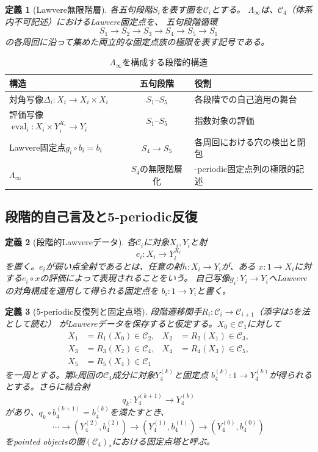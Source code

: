 \documentclass[11pt,a4paper]{ltjsarticle}
\newtheorem{definition}{定義}[section]
\theoremstyle{remark}
\newcommand{\LawvereInfinity}{\Lambda_\infty}
\begin{document}
\begin{definition}[Lawvere無限階層]
各五句段階$S_i$を表す圏を$\mathcal{C}_i$とする。
$\LawvereInfinity$は、$\mathcal{C}_4$（体系内不可記述）におけるLawvere固定点を、
五句段階循環
\[
 S_1\longrightarrow S_2\longrightarrow S_3\longrightarrow S_4
 \longrightarrow S_5\longrightarrow S_1
\]
の各周回に沿って集めた両立的な固定点族の極限を表す記号である。
\end{definition}

\begin{table}[htbp]
\centering
\caption{$\LawvereInfinity$を構成する段階的構造}
\label{tab:lambda-stage}
\small
\begin{tabularx}{\textwidth}{@{}>{\raggedright\arraybackslash}X c >{\raggedright\arraybackslash}X@{}}
\toprule
構造 & 五句段階 & 役割 \\
\midrule
対角写像$\Delta_i:X_i\to X_i\times X_i$ & $S_1$--$S_5$ & 各段階での自己適用の舞台 \\
評価写像$\operatorname{eval}_i:X_i\times Y_i^{X_i}\to Y_i$ & $S_1$--$S_5$ & 指数対象の評価 \\
Lawvere固定点$g_i\circ b_i=b_i$ & $S_4\to S_5$ & 各周回における穴の検出と閉包 \\
$\LawvereInfinity$ & $S_4$の無限階層化 & 5-periodic固定点列の極限的記述 \\
\bottomrule
\end{tabularx}
\end{table}

\subsection{段階的自己言及と5-periodic反復}

\begin{definition}[段階的Lawvereデータ]
各$\mathcal{C}_i$に対象$X_i,Y_i$と射
\[
 e_i:X_i\longrightarrow Y_i^{X_i}
\]
を置く。$e_i$が弱い点全射であるとは、任意の射$h:X_i\to Y_i$が、ある
$x:1\to X_i$に対する$e_i\circ x$の評価によって表現されることをいう。
自己写像$g_i:Y_i\to Y_i$へLawvereの対角構成を適用して得られる固定点を
$b_i:1\to Y_i$と書く。
\end{definition}

\begin{definition}[5-periodic反復列と固定点塔]
段階遷移関手$R_i:\mathcal{C}_i\to\mathcal{C}_{i+1}$（添字は5を法として読む）
がLawvereデータを保存すると仮定する。$X_0\in\mathcal{C}_1$に対して
\[
\begin{aligned}
X_1&=R_1(X_0)\in\mathcal{C}_2,&
X_2&=R_2(X_1)\in\mathcal{C}_3,\\
X_3&=R_3(X_2)\in\mathcal{C}_4,&
X_4&=R_4(X_3)\in\mathcal{C}_5,\\
X_5&=R_5(X_4)\in\mathcal{C}_1
\end{aligned}
\]
を一周とする。第$k$周回の$\mathcal{C}_4$成分に対象$Y_4^{(k)}$と固定点
$b_4^{(k)}:1\to Y_4^{(k)}$が得られるとする。さらに結合射
\[
 q_k:Y_4^{(k+1)}\longrightarrow Y_4^{(k)}
\]
があり、$q_k\circ b_4^{(k+1)}=b_4^{(k)}$を満たすとき、
\[
 \cdots\longrightarrow(Y_4^{(2)},b_4^{(2)})
 \longrightarrow(Y_4^{(1)},b_4^{(1)})
 \longrightarrow(Y_4^{(0)},b_4^{(0)})
\]
をpointed objectsの圏$(\mathcal{C}_4)_*$における固定点塔と呼ぶ。
\end{definition}
\end{document}
